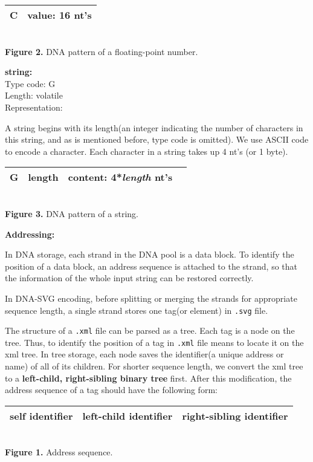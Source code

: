 \documentclass{article}
\begin{document}
\begin{center}
    \begin{tabular}{|c|c|}
        \hline
        C & value: 16 nt's \\
        \hline
    \end{tabular}
    \\[3pt]{\small \textbf{Figure 2.} DNA pattern of a floating-point number.}
\end{center}
\textbf{string:}\\
Type code: G\\
Length: volatile\\
Representation:
\par A string begins with its length(an integer indicating the number of characters in this string, and as is mentioned before, type code is omitted). We use ASCII code to encode a character. Each character in a string takes up 4 nt's (or 1 byte). 
\begin{center}
    \begin{tabular}{|c|c|c|c|}
        \hline
        G & length & content: 4*\textit{length} nt's \\
        \hline
    \end{tabular}
    \\[3pt]{\small \textbf{Figure 3.} DNA pattern of a string.}
\end{center}
{\fontsize{12pt}{14.4pt}\textbf{Addressing:}}
\par In DNA storage, each strand in the DNA pool is a data block. To identify the position of a data block, an address sequence is attached to the strand, so that the information of the whole input string can be restored correctly. 
\par In DNA-SVG encoding, before splitting or merging the strands for appropriate sequence length, a single strand stores one tag(or element) in \texttt{.svg} file. 
\par The structure of a \texttt{.xml} file can be parsed as a tree. Each tag is a node on the tree. Thus, to identify the position of a tag in \texttt{.xml} file means to locate it on the xml tree. In tree storage, each node saves the identifier(a unique address or name) of all of its children.
For shorter sequence length, we convert the xml tree to a \textbf{left-child, right-sibling binary tree} first. After this modification, the address sequence of a tag should have the following form:
\begin{center}
    \begin{tabular}{c|c|c}
        \hline
        self identifier & left-child identifier & right-sibling identifier\\
        \hline
    \end{tabular}
    \\[3pt]{\small \textbf{Figure 1.} Address sequence.}
\end{center}
\end{document}
